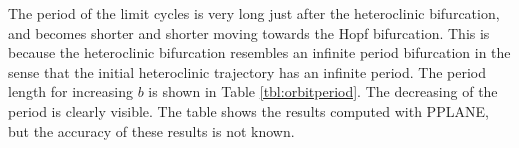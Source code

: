 \begin{figure}[htp]
\centering
{}\hspace{18pt}
\caption{}
\label{fig:}
\end{figure}
The period of the limit cycles is very long just after the heteroclinic bifurcation, and becomes shorter and shorter moving towards the Hopf bifurcation. This is because the heteroclinic bifurcation resembles an infinite period bifurcation in the sense that the initial heteroclinic trajectory has an infinite period. The period length for increasing $b$ is shown in Table \ref{tbl:orbitperiod}.  The decreasing of the period is clearly visible. The table shows the results computed with PPLANE, but the accuracy of these results is not known.
